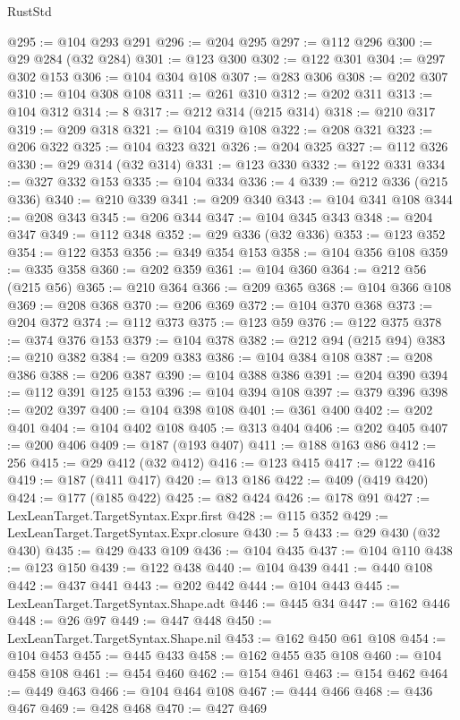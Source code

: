 \begin{lexlean}{RustStd}
\begin{coremodule}
{\begin{coremodule}
{{{{{{{{{{{{{{{{{{{{{{{{{{{{{{{{{{{{{{{{{{{{{{{{{{{{{{{@295 := @104 @293 @291
@296 := @204 @295
@297 := @112 @296
@300 := @29 @284 (@32 @284)
@301 := @123 @300
@302 := @122 @301
@304 := @297 @302 @153
@306 := @104 @304 @108
@307 := @283 @306
@308 := @202 @307
@310 := @104 @308 @108
@311 := @261 @310
@312 := @202 @311
@313 := @104 @312
@314 := 8
@317 := @212 @314 (@215 @314)
@318 := @210 @317
@319 := @209 @318
@321 := @104 @319 @108
@322 := @208 @321
@323 := @206 @322
@325 := @104 @323 @321
@326 := @204 @325
@327 := @112 @326
@330 := @29 @314 (@32 @314)
@331 := @123 @330
@332 := @122 @331
@334 := @327 @332 @153
@335 := @104 @334
@336 := 4
@339 := @212 @336 (@215 @336)
@340 := @210 @339
@341 := @209 @340
@343 := @104 @341 @108
@344 := @208 @343
@345 := @206 @344
@347 := @104 @345 @343
@348 := @204 @347
@349 := @112 @348
@352 := @29 @336 (@32 @336)
@353 := @123 @352
@354 := @122 @353
@356 := @349 @354 @153
@358 := @104 @356 @108
@359 := @335 @358
@360 := @202 @359
@361 := @104 @360
@364 := @212 @56 (@215 @56)
@365 := @210 @364
@366 := @209 @365
@368 := @104 @366 @108
@369 := @208 @368
@370 := @206 @369
@372 := @104 @370 @368
@373 := @204 @372
@374 := @112 @373
@375 := @123 @59
@376 := @122 @375
@378 := @374 @376 @153
@379 := @104 @378
@382 := @212 @94 (@215 @94)
@383 := @210 @382
@384 := @209 @383
@386 := @104 @384 @108
@387 := @208 @386
@388 := @206 @387
@390 := @104 @388 @386
@391 := @204 @390
@394 := @112 @391 @125 @153
@396 := @104 @394 @108
@397 := @379 @396
@398 := @202 @397
@400 := @104 @398 @108
@401 := @361 @400
@402 := @202 @401
@404 := @104 @402 @108
@405 := @313 @404
@406 := @202 @405
@407 := @200 @406
@409 := @187 (@193 @407)
@411 := @188 @163 @86
@412 := 256
@415 := @29 @412 (@32 @412)
@416 := @123 @415
@417 := @122 @416
@419 := @187 (@411 @417)
@420 := @13 @186
@422 := @409 (@419 @420)
@424 := @177 (@185 @422)
@425 := @82 @424
@426 := @178 @91
@427 := LexLeanTarget.TargetSyntax.Expr.first
@428 := @115 @352
@429 := LexLeanTarget.TargetSyntax.Expr.closure
@430 := 5
@433 := @29 @430 (@32 @430)
@435 := @429 @433 @109
@436 := @104 @435
@437 := @104 @110
@438 := @123 @150
@439 := @122 @438
@440 := @104 @439
@441 := @440 @108
@442 := @437 @441
@443 := @202 @442
@444 := @104 @443
@445 := LexLeanTarget.TargetSyntax.Shape.adt
@446 := @445 @34
@447 := @162 @446
@448 := @26 @97
@449 := @447 @448
@450 := LexLeanTarget.TargetSyntax.Shape.nil
@453 := @162 @450 @61 @108
@454 := @104 @453
@455 := @445 @433
@458 := @162 @455 @35 @108
@460 := @104 @458 @108
@461 := @454 @460
@462 := @154 @461
@463 := @154 @462
@464 := @449 @463
@466 := @104 @464 @108
@467 := @444 @466
@468 := @436 @467
@469 := @428 @468
@470 := @427 @469
}}}}}}}}}}}}}}}}}}}}}}}}}}}}}}}}}}}}}}}}}}}}}}}}}}}}}}}
\end{coremodule}}
\end{coremodule}
\end{lexlean}
